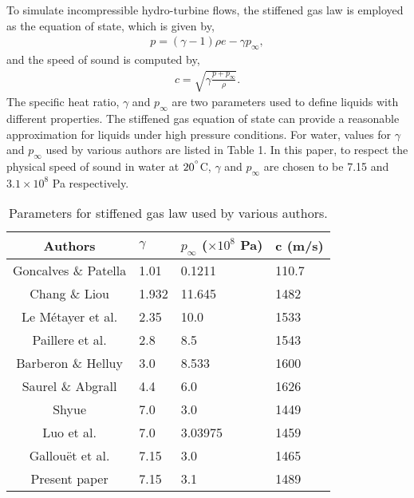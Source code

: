 To simulate incompressible hydro-turbine flows, the stiffened gas law is employed as the equation of state, which is given by,
\begin{align} 
p = (\gamma - 1)\rho e-\gamma p_{\infty},
\end{align}
and the speed of sound is computed by,
\begin{align} 
c=\sqrt{\gamma \frac{p+p_{\infty}}{\rho}}.
\end{align}
The specific heat ratio, $\gamma$ and $p_{\infty}$ are two parameters used to define liquids with different properties. The stiffened gas equation of state can provide a reasonable approximation for liquids under high pressure conditions. For water, values for $\gamma$ and $p_{\infty}$ used by various authors are listed in Table 1. In this paper, to respect the physical speed of sound in water at $20^{\degree}$C, $\gamma$ and $p_{\infty}$ are chosen to be 7.15 and $3.1\times10^{8}$ Pa respectively. 

\begin{table}[t]
\caption{Parameters for stiffened gas law used by various authors.}
\begin{center}
\label{table_ASME} 
\begin{tabular}{c l l l}
\hline
Authors&$\gamma$&$p_{\infty}$ ($\times10^{8}$ Pa)&c (m/s)\\
\hline
Goncalves \& Patella \cite{goncalves2009numerical} &1.01&0.1211&110.7 \\
Chang \& Liou \cite{chang2007robust} &1.932&11.645&1482\\
Le M{\'e}tayer et al. \cite{le2004elaboration}&2.35&10.0&1533\\
Paillere et al. \cite{paillere2003extension}&2.8&8.5&1543\\
Barberon \& Helluy \cite{barberon2005finite}&3.0&8.533&1600\\
Saurel \& Abgrall \cite{saurel1999simple}&4.4&6.0&1626\\
Shyue \cite{shyue1999fluid}&7.0&3.0&1449\\
Luo et al. \cite{luo2004computation}&7.0&3.03975&1459\\
Gallou{\"e}t et al. \cite{gallouet2002some}&7.15&3.0&1465\\
Present paper&7.15&3.1&1489\\
\hline
\end{tabular}
\end{center}
\end{table} 